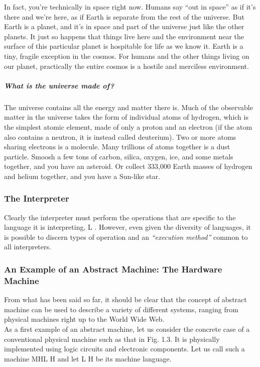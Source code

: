 \documentclass[12pt]{article}
\begin{document}
In fact, you’re technically in space right now. Humans say “out in space” as if it’s there and we’re here, as if Earth is separate from the rest of the universe. But Earth is a planet, and it’s in space and part of the universe just like the other planets. It just so happens that things live here and the environment near the surface of this particular planet is hospitable for life as we know it. Earth is a tiny, fragile exception in the cosmos. For humans and the other things living on our planet, practically the entire cosmos is a hostile and merciless environment.
\subparagraph{ What is the universe made of?}
The universe contains all the energy and matter there is. Much of the observable matter in the universe takes the form of individual atoms of hydrogen, which is the simplest atomic element, made of only a proton and an electron (if the atom also contains a neutron, it is instead called deuterium). Two or more atoms sharing electrons is a molecule. Many trillions of atoms together is a dust particle. Smoosh a few tons of carbon, silica, oxygen, ice, and some metals together, and you have an asteroid. Or collect 333,000 Earth masses of hydrogen and helium together, and you have a Sun-like star.


\subsubsection{The Interpreter}
Clearly the interpreter must perform the operations that are specific to the language it is interpreting, L . However, even given the diversity of languages, it is possible to discern types of operation and an \textit{“execution method”} common to all interpreters.
\subsubsection{An Example of an Abstract Machine: The Hardware Machine}
From what has been said so far, it should be clear that the concept of abstract machine can be used to describe a variety of different systems, ranging from physical machines right up to the World Wide Web.\\
As a first example of an abstract machine, let us consider the concrete case of a
conventional physical machine such as that in Fig. 1.3. It is physically implemented using logic circuits and electronic components. Let us call such a machine MHL H and let L H be its machine language.
\end{document}
